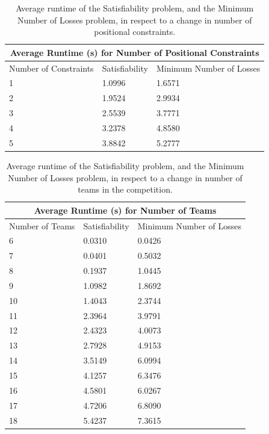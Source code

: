 \documentclass{article}
\begin{document}
	\begin{table}
		\centering
		\begin{tabular}{ |p{1.5cm}||p{3cm}| |p{3cm}| }
			\hline\multicolumn{3}{|c|}{Average Runtime (s) for Number of Positional Constraints} \\
			\hline
			\hline
			Number of Constraints & Satisfiability & Minimum Number of Losses\\
			\hline
			1   & 1.0996    & 1.6571\\
			2&   1.9524  & 2.9934\\
			3 & 2.5539 & 3.7771\\
			4 & 3.2378 & 4.8580\\
			5&   3.8842  & 5.2777\\
			\hline
		\end{tabular}
		\caption{Average runtime of the Satisfiability problem, and the Minimum Number of Losses problem, in respect to a change in number of positional constraints.}
	\end{table}

	\begin{table}
		\centering
		\begin{tabular}{ |p{1.5cm}||p{3cm}| |p{3cm}| }
			\hline\multicolumn{3}{|c|}{Average Runtime (s) for Number of Teams} \\
			\hline
			\hline
			Number of Teams & Satisfiability & Minimum Number of Losses \\
			\hline
			6   & 0.0310    & 0.0426\\
			7&   0.0401  & 0.5032\\
			8 & 0.1937 & 1.0445\\
			9 & 1.0982 & 1.8692\\
			10&   1.4043  & 2.3744\\
			11&   2.3964  & 3.9791\\
			12&   2.4323  & 4.0073\\
			13&   2.7928  & 4.9153\\
			14&   3.5149  & 6.0994\\
			15&   4.1257  & 6.3476\\
			16&   4.5801  & 6.0267\\
			17&   4.7206  & 6.8090\\
			18&   5.4237  & 7.3615\\
			\hline
		\end{tabular}
		\caption{Average runtime of the Satisfiability problem, and the Minimum Number of Losses problem, in respect to a change in number of teams in the competition.}
	\end{table}
\end{document}
